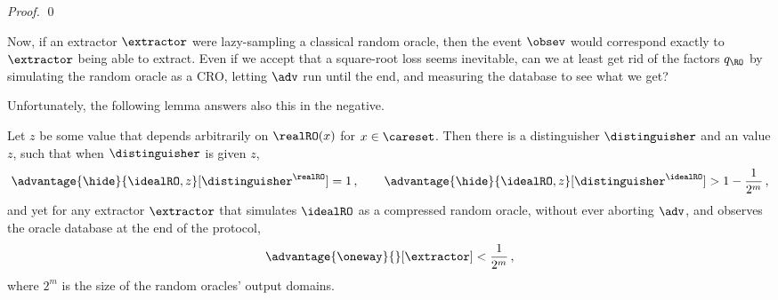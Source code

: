   \begin{proof}
    \qed
  \end{proof}

  \noindent
  Now, if an extractor $\extractor$ were lazy-sampling a classical random
    oracle, then the event $\obsev$ would correspond exactly to $\extractor$
    being able to extract. Even if we accept
    that a square-root loss seems inevitable, can we at least get rid of the
    factors $q_{\RO}$ by simulating the random oracle as a CRO, letting $\adv$
    run until the end, and measuring the database to see what we get?

  Unfortunately, the following lemma answers also this in the negative.

  \begin{lemma}\label{lemma:uncomputing-adv}
    Let $z$ be some value that depends arbitrarily on $\realRO(x)$ for $x
    \in \careset$. Then there is a distinguisher $\distinguisher$ and an value
    $z$, such that when $\distinguisher$ is given $z$,
    \[
      \advantage{\hide}{\idealRO, z}[\distinguisher^{\realRO}] = 1\, ,
      \qquad \advantage{\hide}{\idealRO, z}[\distinguisher^{\idealRO}] > 1 - \frac{1}{2^m}\, ,
    \]
    and yet for any extractor $\extractor$ that simulates
      $\idealRO$ as a compressed random oracle, without
      ever aborting $\adv$, and observes the oracle database at the end of the
      protocol,
    \[
      \advantage{\oneway}{}[\extractor] < \frac{1}{2^m}\, ,
    \]
    where $2^m$ is the size of the random oracles' output domains.
  \end{lemma}
  
